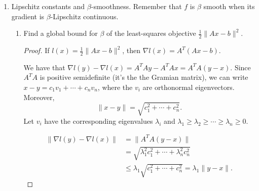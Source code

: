 \documentclass[11pt]{amsart}
\begin{document}
\begin{enumerate}
\begin{enumerate}
\begin{enumerate}
\begin{proof}
  Combining the two inequalities, we'll have that
  \begin{align*}
    f(y) = g(y) + h(y)
    &\geq
  g(x) + h(x) + \langle \nabla g(x) + v, y - x \rangle + \frac{\alpha}{2}\lVert y - x\rVert_2^2 \\
    &= f(x) + \langle \nabla g(x) + v, y - x \rangle + \frac{\alpha}{2}\lVert y - x\rVert_2^2.
  \end{align*}
  Since the last term is always positive, $\nabla g(x) + v \in \partial f(x)$,
  so $f$ is also $\alpha$-strongly convex. 
\end{proof}
\end{enumerate}
\end{enumerate}
\bigskip\bigskip



\item Lipschitz constants and $\beta$-smoothness. Remember that $f$ is $\beta$ smooth when 
its gradient is $\beta$-Lipschitz continuous.   
\begin{enumerate}
\item Find a global bound for $\beta$ of the least-squares objective $\frac{1}{2}\|Ax-b\|^2$.
  \begin{proof}
    If $l(x) = \frac{1}{2}\|Ax-b\|^2$, then $\nabla l(x) = A^T\left(Ax - b\right)$.
    
    We have that $\nabla l(y) - \nabla l(x) = A^TAy - A^TAx = A^TA(y -
    x)$. Since $A^TA$ is positive semidefinite (it's the the Gramian matrix), we
    can write $x - y = c_1v_1 + \cdots + c_nv_n$, where the $v_i$ are
    orthonormal eigenvectors. Moreover,
    $$\lVert x - y \rVert = \sqrt{c_1^2 + \cdots + c_n^2}.$$ Let $v_i$ have the
    corresponding eigenvalues $\lambda_i$ and
    $\lambda_1 \geq \lambda_2 \geq \cdots \geq \lambda_n \geq 0$.
    
    \begin{align*}
      \lVert \nabla l(y) - \nabla l(x) \rVert
      &= \lVert A^TA(y - x) \rVert \\
      &= \sqrt{\lambda_1^2c_1^2 + \cdots + \lambda_n^2c_n^2} \\
      &\leq \lambda_1 \sqrt{c_1^2 + \cdots + c_n^2} = \lambda_1\lVert y - x \rVert.
    \end{align*}


\end{proof}
\end{enumerate}
\end{enumerate}
\end{document}
